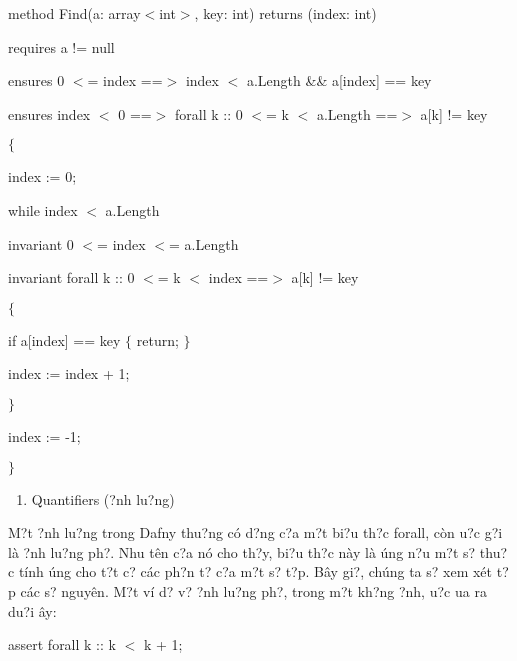 \documentclass{article} %
\begin{document}
\noindent 

\noindent method Find(a: array$<$int$>$, key: int) returns (index: int)

\noindent    requires a != null

\noindent    ensures 0 $<$= index ==$>$ index $<$ a.Length \&\& a[index] == key

\noindent    ensures index $<$ 0 ==$>$ forall k :: 0 $<$= k $<$ a.Length ==$>$ a[k] != key

\noindent $\{$

\noindent    index := 0;

\noindent    while index $<$ a.Length

\noindent       invariant 0 $<$= index $<$= a.Length

\noindent       invariant forall k :: 0 $<$= k $<$ index ==$>$ a[k] != key

\noindent    $\{$

\noindent       if a[index] == key $\{$ return; $\}$

\noindent       index := index + 1;

\noindent    $\}$

\noindent    index := -1;

\noindent $\}$

\begin{enumerate}
\item  Quantifiers ({\dj}?nh lu?ng)
\end{enumerate}

M?t {\dj}?nh lu?ng trong Dafny thu?ng c\'{o} d?ng c?a m?t bi?u th?c forall, c\`{o}n {\dj}u?c g?i l\`{a} {\dj}?nh lu?ng ph?. Nhu t\^{e}n c?a n\'{o} cho th?y, bi?u th?c n\`{a}y l\`{a} {\dj}\'{u}ng n?u m?t s? thu?c t\'{i}nh {\dj}\'{u}ng cho t?t c? c\'{a}c ph?n t? c?a m?t s? t?p. B\^{a}y gi?, ch\'{u}ng ta s? xem x\'{e}t t?p c\'{a}c s? nguy\^{e}n. M?t v\'{i} d? v? {\dj}?nh lu?ng ph?, trong m?t kh?ng {\dj}?nh, {\dj}u?c {\dj}ua ra du?i {\dj}\^{a}y:

\noindent   assert forall k :: k $<$ k + 1;

\noindent 
\end{document}
